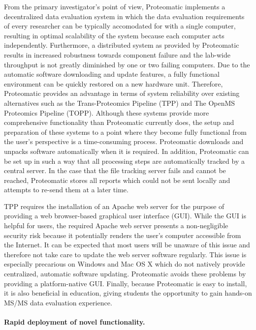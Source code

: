 From the primary investigator's point of view, Proteomatic implements a 
decentralized data evaluation system in which the data evaluation requirements
of every researcher can be typically accomodated for with a single computer,
resulting in optimal scalability of the system because each computer acts 
independently.
Furthermore, a distributed system as provided by Proteomatic results in 
increased robustness towards component failure and the lab-wide throughput
is not greatly diminished by one or two failing computers.
Due to the automatic software downloading and update features, a fully 
functional environment can be quickly restored on a new hardware unit.
Therefore, Proteomatic provides an advantage in terms of system reliability 
over existing alternatives such as the Trans-Proteomics Pipeline (TPP) and 
The OpenMS Proteomics Pipeline (TOPP).
Although these systems provide more comprehensive functionality than Proteomatic
currently does, the setup and preparation of these systems to a point where
they become fully functional from the user's perspective is a time-consuming 
process.
Proteomatic downloads and unpacks software automatically when it is required.
In addition, Proteomatic can be set up in such a way that all processing steps
are automatically tracked by a central server.
In the case that the file tracking server fails and cannot be reached, 
Proteomatic stores all reports which could not be sent locally and attempts
to re-send them at a later time.

TPP requires the installation of an Apache web server for the purpose
of providing a web browser-based graphical user interface (GUI).
While the GUI is helpful for users, the required Apache web server presents a 
non-negligible security risk because it potentially renders the user's computer 
accessible from the Internet.
It can be expected that most users will be unaware of this issue and therefore
not take care to update the web server software regularly.
This issue is especially precarious on Windows and Mac OS X which do not 
natively provide centralized, automatic software updating.
Proteomatic avoids these problems by providing a platform-native GUI.
Finally, because Proteomatic is easy to install, it is also beneficial in 
education, giving students the opportunity to gain hands-on MS/MS data 
evaluation experience.

\paragraph{Rapid deployment of novel functionality.}

